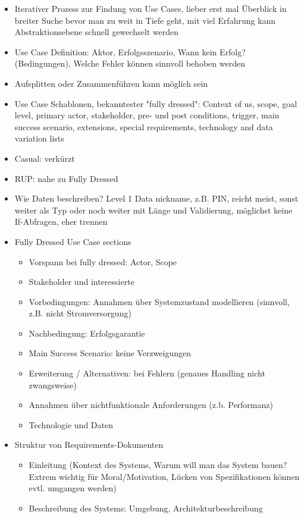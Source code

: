 \documentclass[paper=a4, fontsize=11pt]{scrartcl} %
\numberwithin{equation}{section} %
\numberwithin{figure}{section} %
\numberwithin{table}{section} %
\begin{document}
\begin{itemize}
\begin{itemize}
    \item Iterativer Prozess zur Findung von Use Cases, lieber erst mal Überblick in breiter Suche bevor man zu weit in Tiefe geht, mit viel Erfahrung kann Abstraktionsebene schnell gewechselt werden
    \item Use Case Definition: Aktor, Erfolgsszenario, Wann kein Erfolg? (Bedingungen), Welche Fehler können sinnvoll behoben werden
    \item Aufsplitten oder Zusammenführen kann möglich sein
    \item Use Case Schablonen, bekanntester "fully dressed": Context of us, scope, goal level, primary actor, stakeholder, pre- und post conditions, trigger, main success scenario, extensions, special requirements, technology and data variation lists
    \item Casual: verkürzt
    \item RUP: nahe zu Fully Dressed
    \item Wie Daten beschreiben? Level 1 Data nickname, z.B. PIN, reicht meist, sonst weiter als Typ oder noch weiter mit Länge und Validierung, möglichst keine If-Abfragen, eher trennen
    \item Fully Dressed Use Case sections
    \begin{itemize}
      \item Vorspann bei fully dressed: Actor, Scope
      \item Stakeholder und interessierte
      \item Vorbedingungen: Annahmen über Systemzustand modellieren (sinnvoll, z.B. nicht Stromversorgung)
      \item Nachbedingung: Erfolgsgarantie
      \item Main Success Scenario: keine Verzweigungen
      \item Erweiterung / Alternativen: bei Fehlern (genaues Handling nicht zwangsweise)
      \item Annahmen über nichtfunktionale Anforderungen (z.b. Performanz)
      \item Technologie und Daten
    \end{itemize}
    \item Struktur von Requirements-Dokumenten
    \begin{itemize}
      \item Einleitung (Kontext des Systems, Warum will man das System bauen? Extrem wichtig für Moral/Motivation, Lücken von Spezifikationen können evtl. umgangen werden)
      \item Beschreibung des Systems: Umgebung, Architekturbeschreibung

\end{itemize}
\end{itemize}
\end{itemize}
\end{document}
